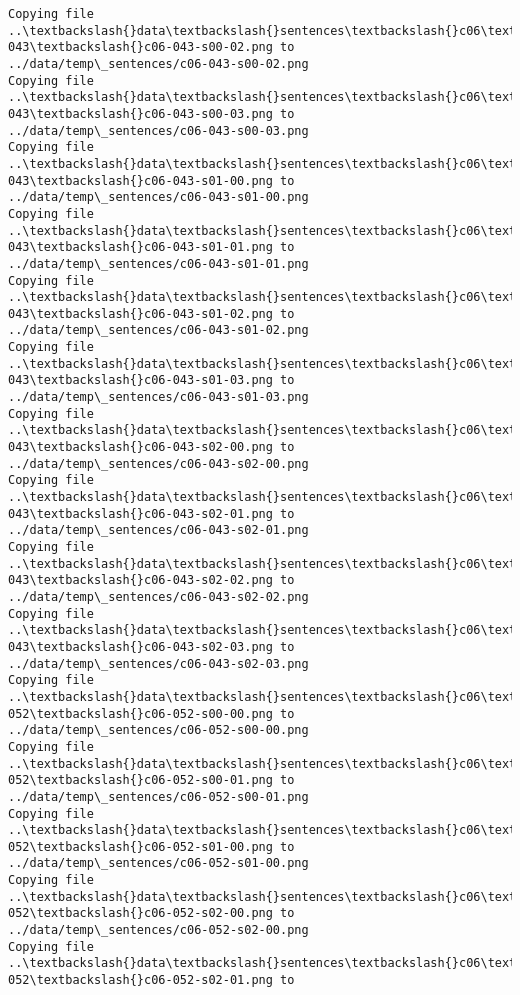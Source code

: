 \documentclass[11pt]{article}
\begin{document}
\begin{Verbatim}[commandchars=\\\{\}]
Copying file ..\textbackslash{}data\textbackslash{}sentences\textbackslash{}c06\textbackslash{}c06-043\textbackslash{}c06-043-s00-02.png to
../data/temp\_sentences/c06-043-s00-02.png
Copying file ..\textbackslash{}data\textbackslash{}sentences\textbackslash{}c06\textbackslash{}c06-043\textbackslash{}c06-043-s00-03.png to
../data/temp\_sentences/c06-043-s00-03.png
Copying file ..\textbackslash{}data\textbackslash{}sentences\textbackslash{}c06\textbackslash{}c06-043\textbackslash{}c06-043-s01-00.png to
../data/temp\_sentences/c06-043-s01-00.png
Copying file ..\textbackslash{}data\textbackslash{}sentences\textbackslash{}c06\textbackslash{}c06-043\textbackslash{}c06-043-s01-01.png to
../data/temp\_sentences/c06-043-s01-01.png
Copying file ..\textbackslash{}data\textbackslash{}sentences\textbackslash{}c06\textbackslash{}c06-043\textbackslash{}c06-043-s01-02.png to
../data/temp\_sentences/c06-043-s01-02.png
Copying file ..\textbackslash{}data\textbackslash{}sentences\textbackslash{}c06\textbackslash{}c06-043\textbackslash{}c06-043-s01-03.png to
../data/temp\_sentences/c06-043-s01-03.png
Copying file ..\textbackslash{}data\textbackslash{}sentences\textbackslash{}c06\textbackslash{}c06-043\textbackslash{}c06-043-s02-00.png to
../data/temp\_sentences/c06-043-s02-00.png
Copying file ..\textbackslash{}data\textbackslash{}sentences\textbackslash{}c06\textbackslash{}c06-043\textbackslash{}c06-043-s02-01.png to
../data/temp\_sentences/c06-043-s02-01.png
Copying file ..\textbackslash{}data\textbackslash{}sentences\textbackslash{}c06\textbackslash{}c06-043\textbackslash{}c06-043-s02-02.png to
../data/temp\_sentences/c06-043-s02-02.png
Copying file ..\textbackslash{}data\textbackslash{}sentences\textbackslash{}c06\textbackslash{}c06-043\textbackslash{}c06-043-s02-03.png to
../data/temp\_sentences/c06-043-s02-03.png
Copying file ..\textbackslash{}data\textbackslash{}sentences\textbackslash{}c06\textbackslash{}c06-052\textbackslash{}c06-052-s00-00.png to
../data/temp\_sentences/c06-052-s00-00.png
Copying file ..\textbackslash{}data\textbackslash{}sentences\textbackslash{}c06\textbackslash{}c06-052\textbackslash{}c06-052-s00-01.png to
../data/temp\_sentences/c06-052-s00-01.png
Copying file ..\textbackslash{}data\textbackslash{}sentences\textbackslash{}c06\textbackslash{}c06-052\textbackslash{}c06-052-s01-00.png to
../data/temp\_sentences/c06-052-s01-00.png
Copying file ..\textbackslash{}data\textbackslash{}sentences\textbackslash{}c06\textbackslash{}c06-052\textbackslash{}c06-052-s02-00.png to
../data/temp\_sentences/c06-052-s02-00.png
Copying file ..\textbackslash{}data\textbackslash{}sentences\textbackslash{}c06\textbackslash{}c06-052\textbackslash{}c06-052-s02-01.png to

\end{Verbatim}
\end{document}
